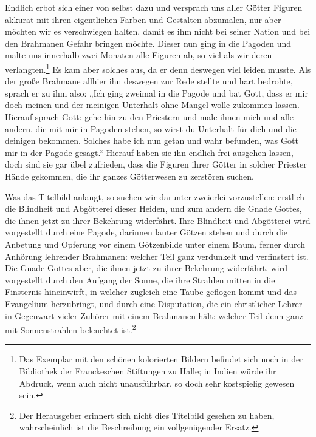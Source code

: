\documentclass{article}
\begin{document}
Endlich erbot sich einer von selbst dazu und versprach uns aller Götter Figuren akkurat mit ihren eigentlichen Farben und Gestalten abzumalen, nur aber möchten wir es verschwiegen halten, damit es ihm nicht bei seiner Nation und bei den Brahmanen Gefahr bringen möchte. Dieser nun ging in die Pagoden und malte uns innerhalb zwei Monaten alle Figuren ab, so viel als wir deren verlangten.\footnote{Das Exemplar mit den schönen kolorierten Bildern befindet sich noch in der Bibliothek der Franckeschen Stiftungen zu Halle; in Indien würde ihr Abdruck, wenn auch nicht unausführbar, so doch sehr kostspielig gewesen sein.} Es kam aber solches aus, da er denn deswegen viel leiden musste. Als der große Brahmane allhier ihn deswegen zur Rede stellte und hart bedrohte, sprach er zu ihm also: „Ich ging zweimal in die Pagode und bat Gott, dass er mir doch meinen und der meinigen Unterhalt ohne Mangel wolle zukommen lassen. Hierauf sprach Gott: gehe hin zu den Priestern und male ihnen mich und alle andern, die mit mir in Pagoden stehen, so wirst du Unterhalt für dich und die deinigen bekommen. Solches habe ich nun getan und wahr befunden, was Gott mir in der Pagode gesagt.“ Hierauf haben sie ihn endlich frei ausgehen lassen, doch sind sie gar übel zufrieden, dass die Figuren ihrer Götter in solcher Priester Hände gekommen, die ihr ganzes Götterwesen zu zerstören suchen.

Was das Titelbild anlangt, so suchen wir darunter zweierlei vorzustellen: erstlich die Blindheit und Abgötterei dieser Heiden, und zum andern die Gnade Gottes, die ihnen jetzt zu ihrer Bekehrung widerfährt. Ihre Blindheit und Abgötterei wird vorgestellt durch eine Pagode, darinnen lauter Götzen stehen und durch die Anbetung und Opferung vor einem Götzenbilde unter einem Baum, ferner durch Anhörung lehrender Brahmanen: welcher Teil ganz verdunkelt und verfinstert ist. Die Gnade Gottes aber, die ihnen jetzt zu ihrer Bekehrung widerfährt, wird vorgestellt durch den Aufgang der Sonne, die ihre Strahlen mitten in die Finsternis hineinwirft, in welcher zugleich eine Taube geflogen kommt und das Evangelium herzubringt, und durch eine Disputation, die ein christlicher Lehrer in Gegenwart vieler Zuhörer mit einem Brahmanen hält: welcher Teil denn ganz mit Sonnenstrahlen beleuchtet ist.\footnote{Der Herausgeber erinnert sich nicht dies Titelbild gesehen zu haben, wahrscheinlich ist die Beschreibung ein vollgenügender Ersatz.}
\end{document}
